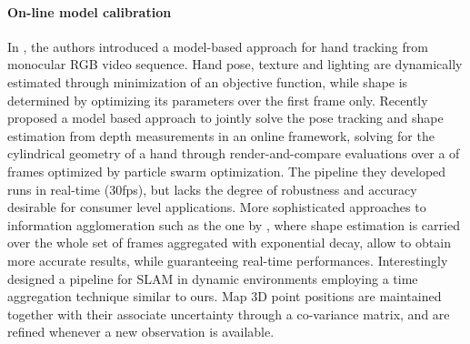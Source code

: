 \paragraph{On-line model calibration}
In \cite{delagorce2011model}, the authors introduced a model-based approach for hand tracking from monocular RGB video sequence. Hand pose, texture and lighting are dynamically estimated through minimization of an objective function, while shape is determined by optimizing its parameters over the first frame only. 
Recently \cite{makris2015model} proposed a model based approach to jointly solve the pose tracking and shape estimation from depth measurements in an online framework, solving for the cylindrical geometry of a hand through render-and-compare evaluations over a   of frames optimized by particle swarm optimization. The pipeline they developed runs in real-time (30fps), but lacks the degree of robustness and accuracy desirable for consumer level applications. 
More sophisticated approaches to information agglomeration such as the one by \cite{bouaziz2013online}, where shape estimation is carried over the whole set of frames aggregated with exponential decay, allow to obtain more accurate results, while guaranteeing real-time performances. 
Interestingly \cite{zou2013coslam} designed a pipeline for SLAM in dynamic environments employing a time aggregation technique similar to ours. Map 3D point positions are maintained together with their associate uncertainty through a co-variance matrix, and are refined whenever a new observation is available.

